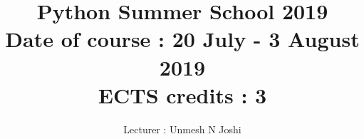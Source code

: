 \documentclass[runningheads]{llncs}
\begin{document}
\title{Python Summer School 2019 \\ Date of course : 20 July - 3 August 2019 \\ ECTS credits : 3}

\author{Lecturer : Unmesh N Joshi}

\maketitle







\end{document}

